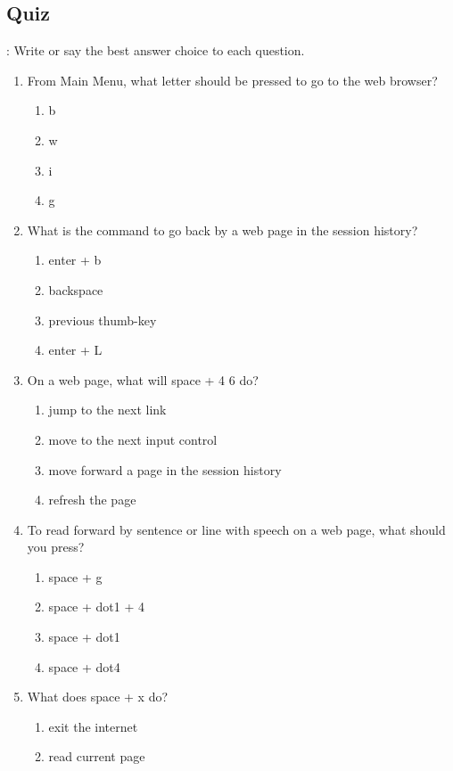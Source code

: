 \documentclass[10pt,letterpaper,twoside]{report}
\begin{document}
\subsection{Quiz}:
Write or say the best answer choice to each question.
\begin{enumerate}
	\item From Main Menu, what letter should be pressed to go to the web browser?
	      \begin{enumerate}
		      \item b
		      \item w
		      \item i
		      \item g
	      \end{enumerate}
	\item What is the command to go back by a web page in the session history?
	      \begin{enumerate}
		      \item enter + b
		      \item backspace
		      \item previous thumb-key
		      \item enter + L
	      \end{enumerate}
	\item On a web page, what will space + 4 6 do?
	      \begin{enumerate}
		      \item jump to the next link
		      \item move to the next input control
		      \item move forward a page in the session history
		      \item refresh the page
	      \end{enumerate}
	\item To read forward by sentence or line with speech on a web page, what should you press?
	      \begin{enumerate}
		      \item space + g
		      \item space + dot1 + 4
		      \item space + dot1
		      \item space + dot4
	      \end{enumerate}
	\item What does space + x do?
	      \begin{enumerate}
		      \item exit the internet
		      \item read current page

\end{enumerate}
\end{enumerate}
\end{document}

